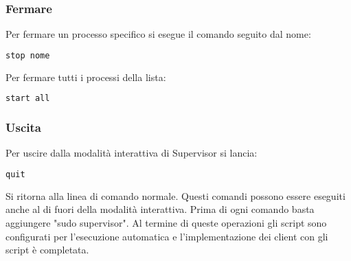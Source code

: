 \subsubsection{Fermare}
\label{subsubsec:client-supervisor-fermare}
Per fermare un processo specifico si esegue il comando seguito dal nome:
\begin{lstlisting}[language=bash]
	stop nome
\end{lstlisting}
Per fermare tutti i processi della lista:
\begin{lstlisting}[language=bash]
	start all
\end{lstlisting}

\subsubsection{Uscita}
\label{subsubsec:client-supervisor-uscita}
Per uscire dalla modalità interattiva di Supervisor si lancia:
\begin{lstlisting}[language=bash]
  quit
\end{lstlisting}
Si ritorna alla linea di comando normale.\newline\newline
Questi comandi possono essere eseguiti anche al di fuori della modalità interattiva.
Prima di ogni comando basta aggiungere "sudo supervisor".\newline\newline
Al termine di queste operazioni gli script sono configurati per l'esecuzione automatica 
e l'implementazione dei client con gli script è completata.
